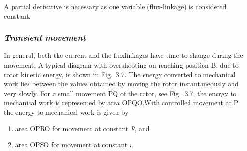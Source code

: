 \documentclass[a4paper,numbers=noenddot,12pt]{scrbook}
\begin{document}
A partial derivative is necessary as one variable (flux-linkage) is considered constant. 
\subsubsection{\textit{Transient movement}}
In general, both the current and the flux­linkages have time to change during the movement. A typical diagram with overshooting on reaching position B, due to rotor kinetic energy, is shown in Fig.\ 3.7. The energy converted to mechanical work lies between the values obtained by moving the rotor instantaneously and very slowly. 
For a small movement PQ of the rotor, see Fig.\ 3.7, the energy to mechanical work is represented by area OPQO.\@ With controlled movement at P the energy to mechanical work is given by
\begin{enumerate}[label={}]
    \item area OPRO for movement at constant $\varPsi$, and
    \item area OPSO for movement at constant $i$.
\end{enumerate}
\end{document}
